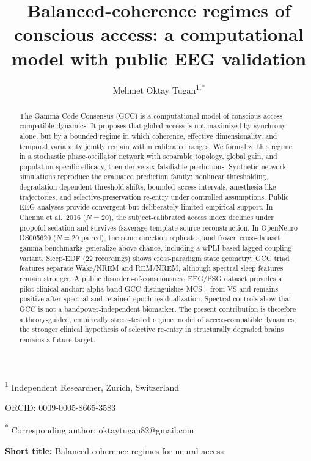 \documentclass[11pt,a4paper]{article}
\title{%
  \textbf{Balanced-coherence regimes of conscious access: a computational model with public EEG validation}
}
\author{%
  Mehmet Oktay Tugan\textsuperscript{1,*}
}
\date{}
\theoremstyle{plain}
\theoremstyle{definition}
\theoremstyle{remark}
\begin{document}
\maketitle
\thispagestyle{fancy}

\noindent
\textsuperscript{1} Independent Researcher, Zurich, Switzerland

\noindent
ORCID: 0009-0005-8665-3583

\noindent
\textsuperscript{*} Corresponding author: oktaytugan82@gmail.com

\medskip
\noindent
\textbf{Short title:} Balanced-coherence regimes for neural access

\bigskip

\begin{abstract}
\noindent
The Gamma-Code Consensus (GCC) is a computational model of conscious-access-compatible dynamics. It proposes that global access is not maximized by synchrony alone, but by a bounded regime in which coherence, effective dimensionality, and temporal variability jointly remain within calibrated ranges. We formalize this regime in a stochastic phase-oscillator network with separable topology, global gain, and population-specific efficacy, then derive six falsifiable predictions. Synthetic network simulations reproduce the evaluated prediction family: nonlinear thresholding, degradation-dependent threshold shifts, bounded access intervals, anesthesia-like trajectories, and selective-preservation re-entry under controlled assumptions. Public EEG analyses provide convergent but deliberately limited empirical support. In Chennu et al.\ 2016 ($N=20$), the subject-calibrated access index declines under propofol sedation and survives fsaverage template-source reconstruction. In OpenNeuro DS005620 ($N=20$ paired), the same direction replicates, and frozen cross-dataset gamma benchmarks generalize above chance, including a wPLI-based lagged-coupling variant. Sleep-EDF ($22$ recordings) shows cross-paradigm state geometry: GCC triad features separate Wake/NREM and REM/NREM, although spectral sleep features remain stronger. A public disorders-of-consciousness EEG/PSG dataset provides a pilot clinical anchor: alpha-band GCC distinguishes MCS+ from VS and remains positive after spectral and retained-epoch residualization. Spectral controls show that GCC is not a bandpower-independent biomarker. The present contribution is therefore a theory-guided, empirically stress-tested regime model of access-compatible dynamics; the stronger clinical hypothesis of selective re-entry in structurally degraded brains remains a future target.
\end{abstract}
\end{document}
